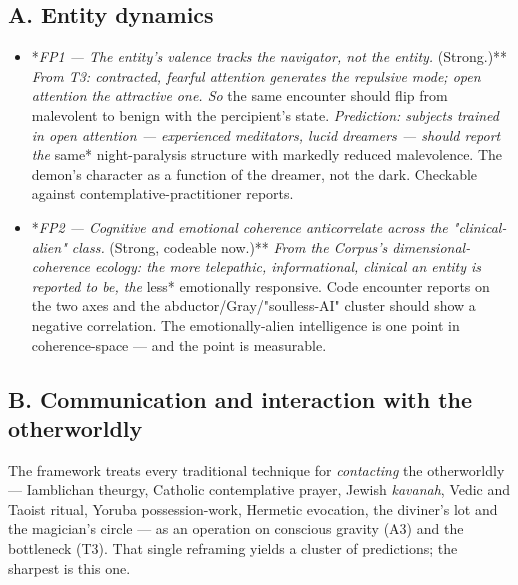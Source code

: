 \documentclass[11pt]{article}
\begin{document}
\subsection*{A. Entity dynamics}
\begin{itemize}
\item *\emph{FP1 --- The entity's valence tracks the navigator, not the entity. }(Strong.)**\emph{ From T3: contracted, fearful attention generates the repulsive mode; open attention the attractive one. So }the same encounter should flip from malevolent to benign with the percipient's state.\emph{ Prediction: subjects trained in open attention --- experienced meditators, lucid dreamers --- should report the }same* night-paralysis structure with markedly reduced malevolence. The demon's character as a function of the dreamer, not the dark. Checkable against contemplative-practitioner reports.
\item *\emph{FP2 --- Cognitive and emotional coherence anticorrelate across the "clinical-alien" class. }(Strong, codeable now.)**\emph{ From the Corpus's dimensional-coherence ecology: the more telepathic, informational, clinical an entity is reported to be, the }less* emotionally responsive. Code encounter reports on the two axes and the abductor/Gray/"soulless-AI" cluster should show a negative correlation. The emotionally-alien intelligence is one point in coherence-space --- and the point is measurable.
\end{itemize}

\subsection*{B. Communication and interaction with the otherworldly}
The framework treats every traditional technique for \emph{contacting} the otherworldly --- Iamblichan theurgy, Catholic contemplative prayer, Jewish \emph{kavanah}, Vedic and Taoist ritual, Yoruba possession-work, Hermetic evocation, the diviner's lot and the magician's circle --- as an operation on conscious gravity (A3) and the bottleneck (T3). That single reframing yields a cluster of predictions; the sharpest is this one.
\end{document}
